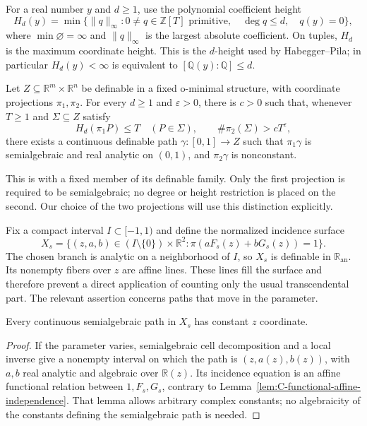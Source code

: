 For a real number $y$ and $d\geq1$, use the polynomial coefficient
height
\[
 H_d(y)=\min\{\|q\|_\infty:
     0\ne q\in\mathbb Z[T]\text{ primitive},\quad
     \deg q\leq d,\quad q(y)=0\},
\]
where $\min\varnothing=\infty$ and $\|q\|_\infty$ is the largest
absolute coefficient.  On tuples, $H_d$ is the maximum coordinate
height.  This is the $d$-height used by Habegger--Pila; in particular
$H_d(y)<\infty$ is equivalent to $[\mathbb Q(y):\mathbb Q]\leq d$.

\begin{theorem}
\label{thm:C-HP-counting}
Let $Z\subseteq\mathbb R^m\times\mathbb R^n$ be definable in a fixed
o-minimal structure, with coordinate projections $\pi_1,\pi_2$.
For every $d\geq1$ and $\varepsilon>0$, there is $c>0$ such that,
whenever $T\geq1$ and $\Sigma\subseteq Z$ satisfy
\[
 H_d(\pi_1P)\leq T\quad(P\in\Sigma),\qquad
                  \#\pi_2(\Sigma)>cT^\varepsilon,
\]
there exists a continuous definable path $\gamma:[0,1]\to Z$ such
that $\pi_1\gamma$ is semialgebraic and real analytic on $(0,1)$,
and $\pi_2\gamma$ is nonconstant.
\end{theorem}

This is \cite[Corollary~7.2]{HabeggerPilaCounting} with a fixed member
of its definable family.  Only the first projection is required to be
semialgebraic; no degree or height restriction is placed on the second.
Our choice of the two projections will use this distinction explicitly.

Fix a compact interval $I\subset[-1,1)$ and define the normalized
incidence surface
\begin{equation}\label{eq:C-normalized-surface}
 X_s=\{(z,a,b)\in(I\setminus\{0\})\times\mathbb R^2:
                      \pi(aF_s(z)+bG_s(z))=1\}.
\end{equation}
The chosen branch is analytic on a neighborhood of $I$, so $X_s$ is
definable in $\mathbb R_{\mathrm{an}}$.  Its nonempty fibers over $z$
are affine lines.  These lines fill the surface and therefore prevent a direct
application of counting only the usual transcendental part.  The
relevant assertion concerns paths that move in the parameter.

\begin{lemma}\label{lem:C-vertical-arcs}
Every continuous semialgebraic path in $X_s$ has constant $z$ coordinate.
\end{lemma}
\begin{proof}
If the parameter varies, semialgebraic cell decomposition and a local
inverse give a nonempty interval on which the path is
$(z,a(z),b(z))$, with $a,b$ real analytic and algebraic over
$\mathbb R(z)$.  Its incidence equation is an affine functional
relation between $1,F_s,G_s$, contrary to
Lemma~\ref{lem:C-functional-affine-independence}.  That lemma allows
arbitrary complex constants; no algebraicity of the constants defining
the semialgebraic path is needed.
\end{proof}

